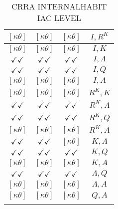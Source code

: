 \documentclass[a4paper,10pt]{article}
\begin{document}
\begin{longtable}{|c|c|c|c|}
\hline
$[\kappa \theta ]$ & $[\kappa \theta ]$ & $[\kappa \theta ]$ & ${I},{R^{K}}$ \\
\hline
$[\kappa \theta ]$ & $[\kappa \theta ]$ & $[\kappa \theta ]$ & ${I},{K}$ \\
\hline
$\checkmark\checkmark$ & $\checkmark\checkmark$ & $\checkmark\checkmark$ & ${I},{\Lambda}$ \\
\hline
$\checkmark\checkmark$ & $\checkmark\checkmark$ & $\checkmark\checkmark$ & ${I},{Q}$ \\
\hline
$[\kappa \theta ]$ & $[\kappa \theta ]$ & $[\kappa \theta ]$ & ${I},{A}$ \\
\hline
$[\kappa \theta ]$ & $[\kappa \theta ]$ & $[\kappa \theta ]$ & ${R^{K}},{K}$ \\
\hline
$\checkmark\checkmark$ & $\checkmark\checkmark$ & $\checkmark\checkmark$ & ${R^{K}},{\Lambda}$ \\
\hline
$\checkmark\checkmark$ & $\checkmark\checkmark$ & $\checkmark\checkmark$ & ${R^{K}},{Q}$ \\
\hline
$[\kappa \theta ]$ & $[\kappa \theta ]$ & $[\kappa \theta ]$ & ${R^{K}},{A}$ \\
\hline
$\checkmark\checkmark$ & $\checkmark\checkmark$ & $[\kappa \theta ]$ & ${K},{\Lambda}$ \\
\hline
$\checkmark\checkmark$ & $\checkmark\checkmark$ & $\checkmark\checkmark$ & ${K},{Q}$ \\
\hline
$[\kappa \theta ]$ & $[\kappa \theta ]$ & $[\kappa \theta ]$ & ${K},{A}$ \\
\hline
$\checkmark\checkmark$ & $\checkmark\checkmark$ & $\checkmark\checkmark$ & ${\Lambda},{Q}$ \\
\hline
$[\kappa \theta ]$ & $[\kappa \theta ]$ & $[\kappa \theta ]$ & ${\Lambda},{A}$ \\
\hline
$[\kappa \theta ]$ & $[\kappa \theta ]$ & $[\kappa \theta ]$ & ${Q},{A}$ \\
\hline
\caption{CRRA INTERNALHABIT IAC LEVEL}
\label{table:MyTableLabel}
\end{longtable}
\end{document}
